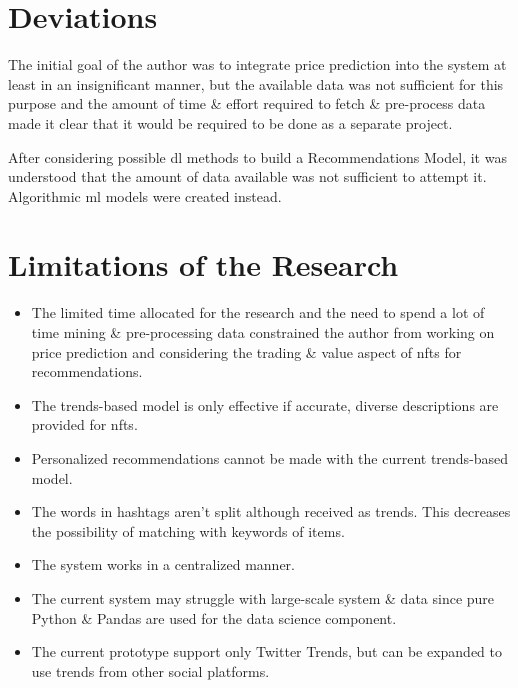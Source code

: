 \section{Deviations}
The initial goal of the author was to integrate price prediction into the system at least in an insignificant manner, but the available data was not sufficient for this purpose and the amount of time \& effort required to fetch \& pre-process data made it clear that it would be required to be done as a separate project.

After considering possible \gls{dl} methods to build a Recommendations Model, it was understood that the amount of data available was not sufficient to attempt it. Algorithmic \gls{ml} models were created instead.

\section{Limitations of the Research}
\begin{itemize}
\item  The limited time allocated for the research and the need to spend a lot of time mining \& pre-processing data constrained the author from working on price prediction and considering the trading \& value aspect of \gls{nft}s for recommendations.
\item The trends-based model is only effective if accurate, diverse descriptions are provided for \gls{nft}s.
\item Personalized recommendations cannot be made with the current trends-based model.
\item The words in hashtags aren't split although received as trends. This decreases the possibility of matching with keywords of items.
\item The system works in a centralized manner.
\item The current system may struggle with large-scale system \& data since pure Python \& Pandas are used for the data science component.
\item The current prototype support only Twitter Trends, but can be expanded to use trends from other social platforms.
\end{itemize}


